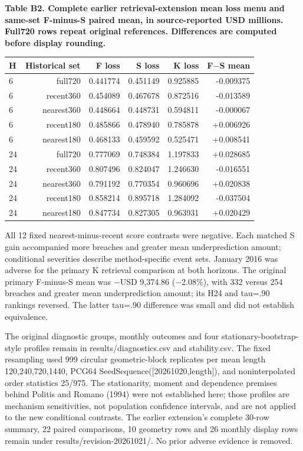 \documentclass[10pt,a4paper]{article}
\begin{document}
\begin{center}
\begin{minipage}{\linewidth}
\small\textbf{Table B2. Complete earlier retrieval-extension mean loss menu and same-set F-minus-S paired mean, in source-reported USD millions. Full720 rows repeat original references. Differences are computed before display rounding.}\par\medskip
\centering\fontsize{8}{10}\selectfont
\begin{tabular}{lrrrrr}
\toprule
H & Historical set & F loss & S loss & K loss & F\(-\)S mean \\
\midrule
6 & full720 & 0.441774 & 0.451149 & 0.925885 & -0.009375 \\
6 & recent360 & 0.454089 & 0.467678 & 0.872516 & -0.013589 \\
6 & nearest360 & 0.448664 & 0.448731 & 0.594811 & -0.000067 \\
6 & recent180 & 0.485866 & 0.478940 & 0.785878 & +0.006926 \\
6 & nearest180 & 0.468133 & 0.459592 & 0.525471 & +0.008541 \\
24 & full720 & 0.777069 & 0.748384 & 1.197833 & +0.028685 \\
24 & recent360 & 0.807496 & 0.824047 & 1.246630 & -0.016551 \\
24 & nearest360 & 0.791192 & 0.770354 & 0.960696 & +0.020838 \\
24 & recent180 & 0.858214 & 0.895718 & 1.284092 & -0.037504 \\
24 & nearest180 & 0.847734 & 0.827305 & 0.963931 & +0.020429 \\
\bottomrule
\end{tabular}
\end{minipage}
\end{center}
All 12 fixed nearest-minus-recent score contrasts were negative. Each matched S gain accompanied more breaches and greater mean underprediction amount; conditional severities describe method-specific event sets. January 2016 was adverse for the primary K retrieval comparison at both horizons. The original primary F-minus-S mean was \(-\)USD 9,374.86 (\(-\)2.08\%), with 332 versus 254 breaches and greater mean underprediction amount; its H24 and tau=.90 rankings reversed. The latter tau=.90 difference was small and did not establish equivalence.

The original diagnostic groups, monthly outcomes and four stationary-bootstrap-style profiles remain in results/diagnostics.csv and stability.csv. The fixed resampling used 999 circular geometric-block replicates per mean length 120,240,720,1440, PCG64 SeedSequence([20261020,length]), and noninterpolated order statistics 25/975. The stationarity, moment and dependence premises behind Politis and Romano (1994) were not established here; those profiles are mechanism sensitivities, not population confidence intervals, and are not applied to the new conditional contrasts. The earlier extension's complete 30-row summary, 22 paired comparisons, 10 geometry rows and 26 monthly display rows remain under results/revision-20261021/. No prior adverse evidence is removed.
\end{document}
